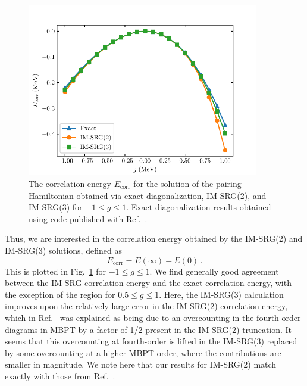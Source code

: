 \begin{figure}[t]
  \centering
  \includegraphics[width=0.9\textwidth]{proposal/doc/images/pairing_ham_imsrg3.pdf}
  \caption[
    The correlation energy $E_{\text{corr}}$ for the solution of the pairing Hamiltonian
    obtained via exact diagonalization,
    IM-SRG(2), and IM-SRG(3)
    for $-1 \le g \le 1$.
  ]{
    The correlation energy $E_{\text{corr}}$ for the solution of the pairing Hamiltonian
    obtained via exact diagonalization,
    IM-SRG(2), and IM-SRG(3)
    for $-1 \le g \le 1$.
    Exact diagonalization results obtained using code published with Ref.~\cite{Liet16lecnotesphysics}.
  }\label{fig:pairing_hamiltonian_fig}
\end{figure}

Thus, we are interested in the correlation energy obtained by the IM-SRG(2) and IM-SRG(3) solutions,
defined as
\begin{equation}
  E_{\text{corr}} = E(\infty) - E(0)\,.
\end{equation}
This is plotted in Fig.~\ref{fig:pairing_hamiltonian_fig} for $-1 \le g \le 1$.
We find generally good agreement between the IM-SRG correlation energy
and the exact correlation energy,
with the exception of the region for $0.5 \le g \le 1$.
Here, the IM-SRG(3) calculation improves upon the relatively large error in the IM-SRG(2)
correlation energy,
which in Ref.~\cite{Herg16imsrglecnotes}
was explained as being due to an overcounting in the fourth-order diagrams in MBPT
by a factor of 1/2 present in the IM-SRG(2) truncation.
It seems that this overcounting at fourth-order is lifted in the IM-SRG(3)
replaced by some overcounting at a higher MBPT order,
where the contributions are smaller in magnitude.
We note here that our results for IM-SRG(2) match exactly with those from Ref.~\cite{Herg16imsrglecnotes}.

